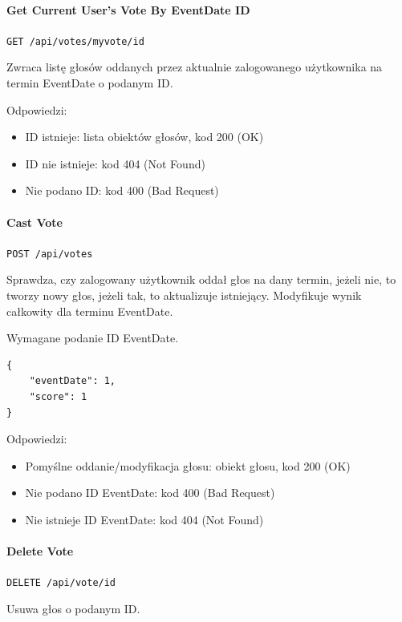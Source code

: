 \documentclass[a4paper,twoside,12pt]{book}
\begin{document}
\paragraph{Get Current User's Vote By EventDate ID}\label{get-current-users-vote-by-eventdate-id}

\texttt{GET /api/votes/myvote/{id}}

Zwraca listę głosów oddanych przez aktualnie zalogowanego użytkownika na termin EventDate o podanym ID.

Odpowiedzi: 
\begin{itemize}
	\item ID istnieje: lista obiektów głosów, kod 200 (OK) 
	\item ID nie istnieje: kod 404 (Not Found) 
	\item Nie podano ID: kod 400 (Bad Request)
\end{itemize}

\paragraph{Cast Vote}\label{cast-vote}

\texttt{POST /api/votes}

Sprawdza, czy zalogowany użytkownik oddał głos na dany termin, jeżeli nie, to tworzy nowy głos, jeżeli tak, to aktualizuje istniejący. Modyfikuje wynik całkowity dla terminu EventDate.

Wymagane podanie ID EventDate.

\begin{verbatim}
{
    "eventDate": 1,
    "score": 1
}
\end{verbatim}

Odpowiedzi: 
\begin{itemize}
	\item Pomyślne oddanie/modyfikacja głosu: obiekt głosu, kod 200 (OK) 
	\item Nie podano ID EventDate: kod 400 (Bad Request) 
	\item Nie istnieje ID EventDate: kod 404 (Not Found)
\end{itemize}

\paragraph{Delete Vote}\label{delete-vote}

\texttt{DELETE /api/vote/{id}}

Usuwa głos o podanym ID.
\end{document}
